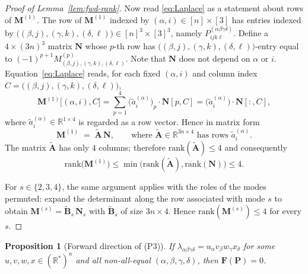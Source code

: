 \documentclass[12pt]{article}
\newtheorem{proposition}[theorem]{Proposition}
\theoremstyle{definition}
\begin{document}
\begin{proof}[Proof of Lemma~\ref{lem:fwd-rank}]
Now read \eqref{eq:Laplace} as a statement about rows of $\mathbf{M}^{(1)}$. The row of
$\mathbf{M}^{(1)}$ indexed by $(\alpha,i)\in[n]\times[3]$ has entries indexed by
$\bigl((\beta,j),(\gamma,k),(\delta,\ell)\bigr)\in[n]^3\times[3]^3$, namely
$P^{(\alpha\beta\gamma\delta)}_{ijk\ell}$. Define a $4\times(3n)^3$ matrix $\mathbf{N}$ whose
$p$-th row has $\bigl((\beta,j),(\gamma,k),(\delta,\ell)\bigr)$-entry equal to
$(-1)^{p+1}M^{(p)}_{(\beta,j),(\gamma,k),(\delta,\ell)}$. Note that $\mathbf{N}$ does not
depend on $\alpha$ or $i$. Equation~\eqref{eq:Laplace} reads, for each fixed
$(\alpha,i)$ and column index $C=\bigl((\beta,j),(\gamma,k),(\delta,\ell)\bigr)$,
\begin{equation}\label{eq:row-decomp}
\mathbf{M}^{(1)}\bigl[(\alpha,i),C\bigr]
=\sum_{p=1}^{4}\bigl(\widetilde{a}^{(\alpha)}_i\bigr)_p\cdot \mathbf{N}[p,C]
=\bigl(\widetilde{a}^{(\alpha)}_i\bigr)\cdot\mathbf{N}[:,C],
\end{equation}
where $\widetilde{a}^{(\alpha)}_i\in\mathbb{R}^{1\times 4}$ is regarded as a row vector.
Hence in matrix form
\begin{equation}\label{eq:matrix-factor}
\mathbf{M}^{(1)}\;=\;\widetilde{\mathbf{A}}\,\mathbf{N},
\qquad\text{where }\widetilde{\mathbf{A}}\in\mathbb{R}^{3n\times 4}\text{ has rows }\widetilde{a}^{(\alpha)}_i.
\end{equation}
The matrix $\widetilde{\mathbf{A}}$ has only $4$ columns; therefore
$\mathrm{rank}(\widetilde{\mathbf{A}})\leq 4$ and consequently
\begin{equation}\label{eq:M1-rank}
\mathrm{rank}\bigl(\mathbf{M}^{(1)}\bigr)\leq\min\bigl(\mathrm{rank}(\widetilde{\mathbf{A}}),\mathrm{rank}(\mathbf{N})\bigr)\leq 4.
\end{equation}

For $s\in\{2,3,4\}$, the same argument applies with the roles of the modes permuted:
expand the determinant along the row associated with mode $s$ to obtain
$\mathbf{M}^{(s)}=\widetilde{\mathbf{B}}_s\,\mathbf{N}_s$ with $\widetilde{\mathbf{B}}_s$ of
size $3n\times 4$. Hence $\mathrm{rank}(\mathbf{M}^{(s)})\leq 4$ for every $s$.
\end{proof}

\begin{proposition}[Forward direction of (P3)]\label{prop:fwd}
If $\lambda_{\alpha\beta\gamma\delta}=u_\alpha v_\beta w_\gamma x_\delta$ for some
$u,v,w,x\in(\mathbb{R}^*)^n$ and all non-all-equal $(\alpha,\beta,\gamma,\delta)$, then
$\mathbf{F}(\mathbf{P})=0$.
\end{proposition}
\end{document}
